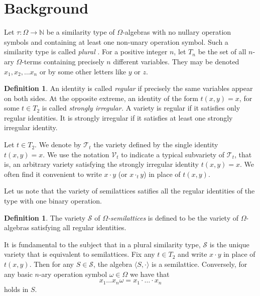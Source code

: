 \documentclass{birkau}
\def\Om{\Omega}
\newcommand{\mcV}{\mathcal{V}}
\newcommand{\mcT}{\mathcal{T}}
\newcommand{\mcS}{\mathcal{S}}
\theoremstyle{plain}
\theoremstyle{definition}
\newtheorem{definition}[theorem]{Definition}
\numberwithin{equation}{section}
\begin{document}
\section{Background}


Let $\tau\colon \Omega \rightarrow \mathbb{N}$ be a similarity type of $\Omega$-algebras with
no nullary operation symbols and containing at least one non-unary operation symbol. Such
a similarity type is called \emph{plural} \cite{RS02}. For a positive integer $n$, let
$T_{n}$ be the set of all $n$-ary $\Om$-terms containing precisely $n$ different
variables. They may be denoted $x_1, x_2, \dots x_n$ or by some other letters like $y$ or
$z$.


\begin{definition}\label{defn:regular_id}
  An identity is called \emph{regular} if precisely the same variables appear on both
  sides. At the opposite extreme, an identity of the form $t(x,y)=x$, for some $t\in T_2$
  is called \emph{strongly irregular.} A variety is regular if it satisfies only regular
  identities. It is strongly irregular if it satisfies at least one strongly irregular
  identity.
\end{definition}

Let $t\in T_2$. We denote by $\mcT_t$ the variety defined by the
single identity $t(x,y)=x$. We use the notation $\mcV_t$ to indicate a typical subvariety
of $\mcT_t$, that is, an arbitrary variety satisfying the strongly irregular identity
$t(x,y)=x$. We often find it convenient to write $x\cdot y$ (or $x\cdot_t y$) in place of
$t(x,y)$.



Let us note that the variety of  semilattices satifies all the regular identities
of the type with one binary operation. 

\begin{definition}
  The variety $\mcS$ of \emph{$\Omega$-semilattices} is defined to be the variety of
  $\Omega$-algebras satisfying all regular identities.
\end{definition}


It is fundamental to the subject that in a plural similarity type, $\mcS$ is the unique
variety that is equivalent to semilattices. Fix any $t\in T_2$ and write $x\cdot y$ in
place of $t(x,y)$. Then for any $S\in \mcS$, the algebra $\langle S,\cdot\rangle$ is a
semilattice. Conversely, for any basic $n$-ary operation symbol $\omega \in \Omega$ we
have that
\begin{equation}\label{E:sl}
x_1 \dots x_n \omega = x_1\cdot \dots \cdot x_n
\end{equation}
holds in $S$.
\end{document}
